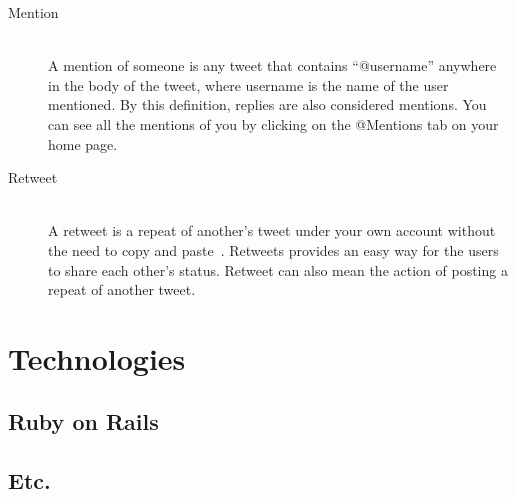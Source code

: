\begin{description}
\item[Mention] \hfill \\
 A mention of someone is any tweet that
  contains ``@username'' anywhere in the body of the tweet, where
  username is the name of the user mentioned. By this definition,
  replies are also considered mentions. You can see all the mentions
  of you by clicking on the @Mentions tab on your home page.

\item[Retweet] \hfill \\
A retweet is a repeat of another’s tweet under
  your own account without the need to copy and paste~\cite{morris09}.
  Retweets provides an easy way for the users to share each other's
  status. Retweet can also mean the action of posting a repeat of
  another tweet.

\end{description}

\section{Technologies}
\subsection{Ruby on Rails}
\subsection{Etc.}


